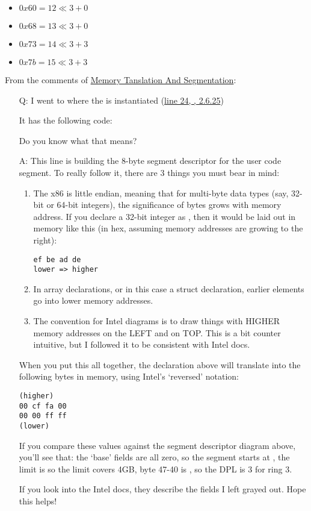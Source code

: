 \begin{itemize}
\item $0x60 = 12 \ll 3 + 0$
\item $0x68 = 13 \ll 3 + 0$
\item $0x73 = 14 \ll 3 + 3$
\item $0x7b = 15 \ll 3 + 3$
\end{itemize}

From the comments of
\href{http://duartes.org/gustavo/blog/post/memory-translation-and-segmentation}{Memory
  Tanslation And Segmentation}:

\begin{itemize}
\item[Q:] I went to where the  is instantiated
  (\href{http://lxr.linux.no/linux+v2.6.25.6/arch/x86/kernel/cpu/common.c#L24}{line 24,
    , 2.6.25})

  It has the following code:


  Do you know what that means?
\item[A:] This line is building the 8-byte segment descriptor for the user code
  segment. To really follow it, there are 3 things you must bear in mind:
  \begin{enumerate}
  \item The x86 is little endian, meaning that for multi-byte data types (say, 32-bit or
    64-bit integers), the significance of bytes grows with memory address. If you declare
    a 32-bit integer as , then it would be laid out in memory like this
    (in hex, assuming memory addresses are growing to the right):
\begin{verbatim}
ef be ad de
lower => higher
\end{verbatim}
  \item In array declarations, or in this case a struct declaration, earlier elements go
    into lower memory addresses.
  \item The convention for Intel diagrams is to draw things with HIGHER memory addresses
    on the LEFT and on TOP. This is a bit counter intuitive, but I followed it to be
    consistent with Intel docs.
  \end{enumerate}
  When you put this all together, the declaration above will translate into the following
  bytes in memory, using Intel’s ‘reversed’ notation:
\begin{verbatim}
(higher)
00 cf fa 00
00 00 ff ff
(lower)
\end{verbatim}
  If you compare these values against the segment descriptor diagram above, you’ll see
  that: the ‘base’ fields are all zero, so the segment starts at , the
  limit is  so the limit covers 4GB, byte 47-40 is , so the
  DPL is 3 for ring 3.

  If you look into the Intel docs, they describe the fields I left grayed out. Hope this
  helps!
\end{itemize}

